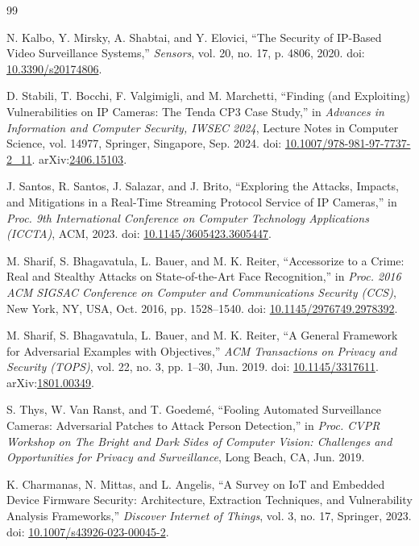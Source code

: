\documentclass[letterpaper, 10pt, conference]{ieeeconf}
\begin{document}
\balance
\begin{thebibliography}{99}

N. Kalbo, Y. Mirsky, A. Shabtai, and Y. Elovici,
``The Security of IP-Based Video Surveillance Systems,''
\textit{Sensors}, vol. 20, no. 17, p. 4806, 2020.
doi: \href{https://doi.org/10.3390/s20174806}{10.3390/s20174806}.

D. Stabili, T. Bocchi, F. Valgimigli, and M. Marchetti,
``Finding (and Exploiting) Vulnerabilities on IP Cameras:
The Tenda CP3 Case Study,''
in \textit{Advances in Information and Computer Security,
IWSEC 2024}, Lecture Notes in Computer Science, vol. 14977,
Springer, Singapore, Sep. 2024.
doi: \href{https://doi.org/10.1007/978-981-97-7737-2_11}{10.1007/978-981-97-7737-2\_11}.
arXiv:\href{https://arxiv.org/abs/2406.15103}{2406.15103}.

J. Santos, R. Santos, J. Salazar, and J. Brito,
``Exploring the Attacks, Impacts, and Mitigations in a Real-Time
Streaming Protocol Service of IP Cameras,''
in \textit{Proc. 9th International Conference on Computer
Technology Applications (ICCTA)},
ACM, 2023.
doi: \href{https://doi.org/10.1145/3605423.3605447}{10.1145/3605423.3605447}.

M. Sharif, S. Bhagavatula, L. Bauer, and M. K. Reiter,
``Accessorize to a Crime: Real and Stealthy Attacks on
State-of-the-Art Face Recognition,''
in \textit{Proc. 2016 ACM SIGSAC Conference on Computer and
Communications Security (CCS)},
New York, NY, USA, Oct. 2016, pp. 1528--1540.
doi: \href{https://doi.org/10.1145/2976749.2978392}{10.1145/2976749.2978392}.

M. Sharif, S. Bhagavatula, L. Bauer, and M. K. Reiter,
``A General Framework for Adversarial Examples with Objectives,''
\textit{ACM Transactions on Privacy and Security (TOPS)},
vol. 22, no. 3, pp. 1--30, Jun. 2019.
doi: \href{https://doi.org/10.1145/3317611}{10.1145/3317611}.
arXiv:\href{https://arxiv.org/abs/1801.00349}{1801.00349}.

S. Thys, W. Van Ranst, and T. Goedem\'{e},
``Fooling Automated Surveillance Cameras: Adversarial Patches
to Attack Person Detection,''
in \textit{Proc. CVPR Workshop on The Bright and Dark Sides
of Computer Vision: Challenges and Opportunities for Privacy
and Surveillance},
Long Beach, CA, Jun. 2019.

K. Charmanas, N. Mittas, and L. Angelis,
``A Survey on IoT and Embedded Device Firmware Security:
Architecture, Extraction Techniques, and Vulnerability
Analysis Frameworks,''
\textit{Discover Internet of Things},
vol. 3, no. 17, Springer, 2023.
doi: \href{https://doi.org/10.1007/s43926-023-00045-2}{10.1007/s43926-023-00045-2}.


\end{thebibliography}
\end{document}
